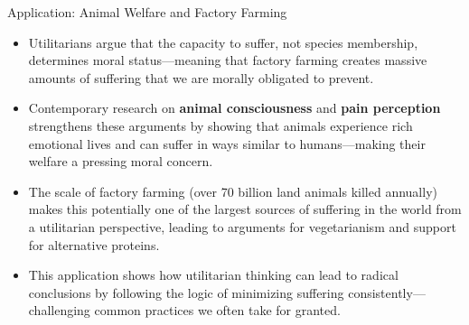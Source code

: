\documentclass[aspectratio=169]{beamer}
\begin{document}
\begin{frame}{Application: Animal Welfare and Factory Farming}
    \begin{itemize}
        \item Utilitarians argue that the capacity to suffer, not species membership, determines moral status—meaning that factory farming creates massive amounts of suffering that we are morally obligated to prevent.
        
        \item Contemporary research on \textbf{animal consciousness} and \textbf{pain perception} strengthens these arguments by showing that animals experience rich emotional lives and can suffer in ways similar to humans—making their welfare a pressing moral concern.
        
        \item The scale of factory farming (over 70 billion land animals killed annually) makes this potentially one of the largest sources of suffering in the world from a utilitarian perspective, leading to arguments for vegetarianism and support for alternative proteins.
        
        \item This application shows how utilitarian thinking can lead to radical conclusions by following the logic of minimizing suffering consistently—challenging common practices we often take for granted.
    \end{itemize}
\end{frame}
\end{document}
